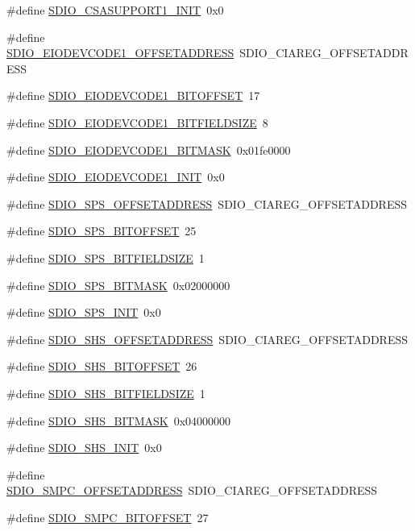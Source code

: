 \begin{DoxyCompactItemize}
\item 
\#define \hyperlink{a00571_abf63bad60ad0bd76366671fdb1cc2f32}{SDIO\_\-CSASUPPORT1\_\-INIT}~0x0
\item 
\#define \hyperlink{a00571_a94c07b17727ac60a9c42c64bcaa318d8}{SDIO\_\-EIODEVCODE1\_\-OFFSETADDRESS}~SDIO\_\-CIAREG\_\-OFFSETADDRESS
\item 
\#define \hyperlink{a00571_ac0b075f10d6898d1514ed9ed52b1777a}{SDIO\_\-EIODEVCODE1\_\-BITOFFSET}~17
\item 
\#define \hyperlink{a00571_a795135a7bf3db9370cd3b36bd1cb21fe}{SDIO\_\-EIODEVCODE1\_\-BITFIELDSIZE}~8
\item 
\#define \hyperlink{a00571_ac7cf8537f860fa8f82dc331ce9f1edd0}{SDIO\_\-EIODEVCODE1\_\-BITMASK}~0x01fe0000
\item 
\#define \hyperlink{a00571_a0ba8f89fbf6334148a22804882e7ba4e}{SDIO\_\-EIODEVCODE1\_\-INIT}~0x0
\item 
\#define \hyperlink{a00571_a3f97175ab11f94e4db8dc469caf2ca51}{SDIO\_\-SPS\_\-OFFSETADDRESS}~SDIO\_\-CIAREG\_\-OFFSETADDRESS
\item 
\#define \hyperlink{a00571_a8d8f70d9347482820572acc85ea04fb4}{SDIO\_\-SPS\_\-BITOFFSET}~25
\item 
\#define \hyperlink{a00571_a16277cab4a073132a78694cc098ffe8f}{SDIO\_\-SPS\_\-BITFIELDSIZE}~1
\item 
\#define \hyperlink{a00571_a5bcad6685665fa424925c3234dfaa4a7}{SDIO\_\-SPS\_\-BITMASK}~0x02000000
\item 
\#define \hyperlink{a00571_aa9392a3dbd6492336cb904fae5b068af}{SDIO\_\-SPS\_\-INIT}~0x0
\item 
\#define \hyperlink{a00571_a9138e2b54a267468f859752d8fb85eda}{SDIO\_\-SHS\_\-OFFSETADDRESS}~SDIO\_\-CIAREG\_\-OFFSETADDRESS
\item 
\#define \hyperlink{a00571_ab3da35dd441b9fc0225fd027dd8e782a}{SDIO\_\-SHS\_\-BITOFFSET}~26
\item 
\#define \hyperlink{a00571_ad23e926ab988cff1f125e6c8c9aa401d}{SDIO\_\-SHS\_\-BITFIELDSIZE}~1
\item 
\#define \hyperlink{a00571_ae0027247fd2b70822f83a1d4750b19a5}{SDIO\_\-SHS\_\-BITMASK}~0x04000000
\item 
\#define \hyperlink{a00571_ae83d47857bea97a6ffa28bab2d467d75}{SDIO\_\-SHS\_\-INIT}~0x0
\item 
\#define \hyperlink{a00571_a64e3f4662d9474a4cecfab8d6833909a}{SDIO\_\-SMPC\_\-OFFSETADDRESS}~SDIO\_\-CIAREG\_\-OFFSETADDRESS
\item 
\#define \hyperlink{a00571_a022fb2e23208737a54425a001d5b173a}{SDIO\_\-SMPC\_\-BITOFFSET}~27

\end{DoxyCompactItemize}
